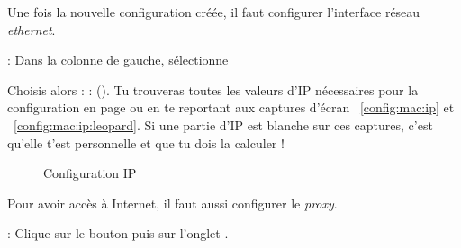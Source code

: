 
Une fois la nouvelle configuration créée, il faut configurer l'interface réseau \emph{ethernet}.





 : Dans la colonne de gauche, sélectionne 

Choisis alors  :%
 :  (). Tu trouveras toutes les valeurs d'IP nécessaires pour la configuration en page \pageref{calcul_ip} ou en te reportant aux captures d'écran ~\ref{config:mac:ip} et ~\ref{config:mac:ip:leopard}. Si une partie d'IP est blanche sur ces captures, c'est qu'elle t'est personnelle et que tu dois la calculer !

  \begin{figure}[!hl]
    \begin{center}
      \caption{Configuration IP}
    \end{center}
  \end{figure}
  
  


Pour avoir accès à Internet, il faut aussi configurer le \emph{proxy}.

 : Clique sur le bouton  puis sur l'onglet .


